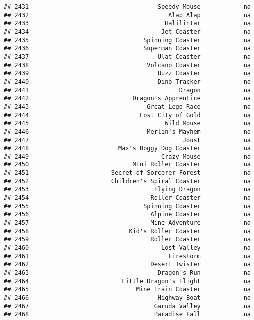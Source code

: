 \documentclass[
]{article}
\begin{document}
\begin{verbatim}
## 2431                                    Speedy Mouse            na
## 2432                                       Alap Alap            na
## 2433                                      Halilintar            na
## 2434                                     Jet Coaster            na
## 2435                                Spinning Coaster            na
## 2436                                Superman Coaster            na
## 2437                                    Ulat Coaster            na
## 2438                                 Volcano Coaster            na
## 2439                                    Buzz Coaster            na
## 2440                                    Dino Tracker            na
## 2441                                          Dragon            na
## 2442                             Dragon's Apprentice            na
## 2443                                 Great Lego Race            na
## 2444                               Lost City of Gold            na
## 2445                                      Wild Mouse            na
## 2446                                 Merlin's Mayhem            na
## 2447                                           Joust            na
## 2448                         Max's Doggy Dog Coaster            na
## 2449                                     Crazy Mouse            na
## 2450                             MIni Roller Coaster            na
## 2451                       Secret of Sorcerer Forest            na
## 2452                       Children's Spiral Coaster            na
## 2453                                   Flying Dragon            na
## 2454                                  Roller Coaster            na
## 2455                                Spinning Coaster            na
## 2456                                  Alpine Coaster            na
## 2457                                  Mine Adventure            na
## 2458                            Kid's Roller Coaster            na
## 2459                                  Roller Coaster            na
## 2460                                     Lost Valley            na
## 2461                                       Firestorm            na
## 2462                                  Desert Twister            na
## 2463                                    Dragon's Run            na
## 2464                          Little Dragon's Flight            na
## 2465                              Mine Train Coaster            na
## 2466                                    Highway Boat            na
## 2467                                   Garuda Valley            na
## 2468                                   Paradise Fall            na

\end{verbatim}
\end{document}
